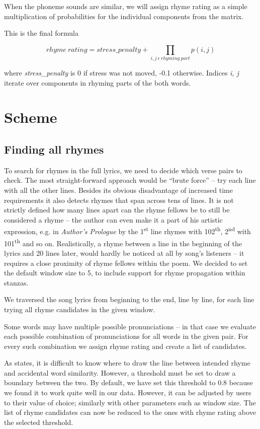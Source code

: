 	When the phoneme sounds are similar, we will assign rhyme rating as a simple multiplication of probabilities for the individual components from the matrix. 

This is the final formula
	
	\[rhyme\ rating = stress\_penalty + \prod_{i,j\ \epsilon\ rhyming\ part} p(i,j) \]
	
where \textit{stress\_penalty} is 0 if stress was not moved, -0.1 otherwise. Indices \textit{i, j} iterate over components in rhyming parts of the both words.





\section{Scheme}
\subsection{Finding all rhymes}\label{finding-all-rhymes}
To search for rhymes in the full lyrics, we need to decide which verse pairs to check. The most straight-forward approach would be ``brute force'' -- try each line with all the other lines. Besides its obvious disadvantage of increased time requirements it also detects rhymes that span across tens of lines. It is not strictly defined how many lines apart can the rhyme fellows be to still be considered a rhyme -- the author can even make it a part of his artistic expression, e.g. in \textit{Author's Prologue} by \cite{thomas1952author} the 1\textsuperscript{st} line rhymes with 102\textsuperscript{th}, 2\textsuperscript{nd} with 101\textsuperscript{th} and so on. Realistically, a rhyme between a line in the beginning of the lyrics and 20 lines later, would hardly be noticed at all by song's listeners -- it requires a close proximity of rhyme fellows within the poem. We decided to set the default window size to 5, to include support for rhyme propagation within stanzas.


We traversed the song lyrics from beginning to the end, line by line, for each line trying all rhyme candidates in the given window.

Some words may have multiple possible pronunciations -- in that case we evaluate each possible combination of pronunciations for all words in the given pair. For every such combination we assign rhyme rating and create a list of candidates.

As \cite{rhymes_overview} states, it is difficult to know where to draw the line between intended rhyme and accidental word similarity. However, a threshold must be set to draw a boundary between the two. By default, we have set this threshold to 0.8 because we found it to work quite well in our data. However, it can be adjusted by users to their value of choice; similarly with other parameters such as window size. The list of rhyme candidates can now be reduced to the ones with rhyme rating above the selected threshold.

